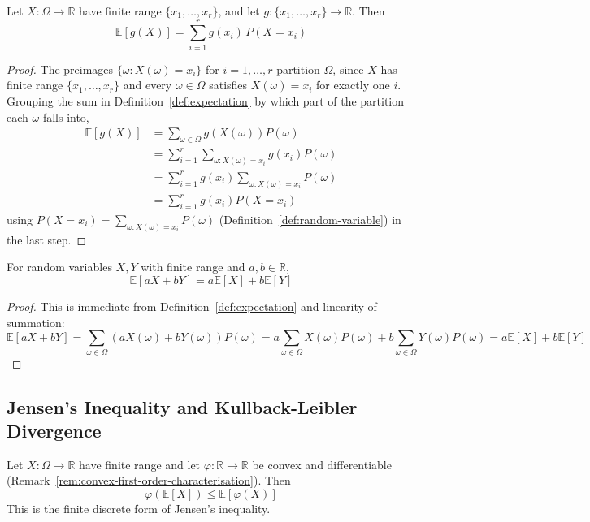 		\begin{lemma}
			\label{lem:expectation-via-distribution}
			Let $X:\Omega\to\mathbb{R}$ have finite range $\{x_1,\dots,x_r\}$, and let $g:\{x_1,\dots,x_r\}\to\mathbb{R}$. Then
			\[
				\mathbb{E}[g(X)] = \sum_{i=1}^r g(x_i)\,P(X=x_i)
			\]
		\end{lemma}
		
		\begin{proof}
			The preimages $\{\omega : X(\omega)=x_i\}$ for $i=1,\dots,r$ partition $\Omega$, since $X$ has finite range $\{x_1,\dots,x_r\}$ and every $\omega\in\Omega$ satisfies $X(\omega)=x_i$ for exactly one $i$. Grouping the sum in Definition~\ref{def:expectation} by which part of the partition each $\omega$ falls into,
			\begin{align*}
				\mathbb{E}[g(X)] &= \sum_{\omega\in\Omega} g(X(\omega))P(\omega) \\
				&= \sum_{i=1}^r \sum_{\omega : X(\omega)=x_i} g(x_i)P(\omega) \\
				&= \sum_{i=1}^r g(x_i) \sum_{\omega:X(\omega)=x_i} P(\omega) \\
				&= \sum_{i=1}^r g(x_i)P(X=x_i)
			\end{align*}
			using $P(X=x_i) = \sum_{\omega:X(\omega)=x_i}P(\omega)$ (Definition~\ref{def:random-variable}) in the last step.
		\end{proof}
		
		\begin{corollary}
			\label{cor:linearity-expectation}
			For random variables $X,Y$ with finite range and $a,b\in\mathbb{R}$,
			\[
				\mathbb{E}[aX+bY] = a\mathbb{E}[X] + b\mathbb{E}[Y]
			\]
		\end{corollary}
		
		\begin{proof}
			This is immediate from Definition~\ref{def:expectation} and linearity of summation:
			\[
				\mathbb{E}[aX+bY] = \sum_{\omega\in\Omega}(aX(\omega)+bY(\omega))P(\omega) = a\sum_{\omega\in\Omega}X(\omega)P(\omega) + b\sum_{\omega\in\Omega}Y(\omega)P(\omega) = a\mathbb{E}[X]+b\mathbb{E}[Y]
			\]
		\end{proof}
		
	\subsection{Jensen's Inequality and Kullback-Leibler Divergence}
		
		\begin{theorem}
			\label{thm:jensen}
			Let $X:\Omega\to\mathbb{R}$ have finite range and let $\varphi:\mathbb{R}\to\mathbb{R}$ be convex and differentiable (Remark~\ref{rem:convex-first-order-characterisation}). Then
			\[
				\varphi(\mathbb{E}[X]) \le \mathbb{E}[\varphi(X)]
			\]
			This is the finite discrete form of Jensen's inequality.
		\end{theorem}
		
